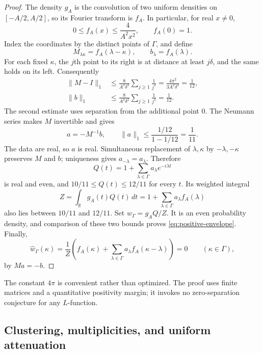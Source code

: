 \begin{proof}
The density $g_A$ is the convolution of two uniform densities on
$[-A/2,A/2]$, so its Fourier transform is $f_A$. In particular, for
real $x\ne0$,
\[
 0\le f_A(x)\le\frac4{A^2x^2},\qquad f_A(0)=1.
\]
Index the coordinates by the distinct points of $\Gamma$, and define
\[
 M_{\lambda\kappa}=f_A(\lambda-\kappa),
 \qquad b_\lambda=f_A(\lambda).
\]
For each fixed $\kappa$, the $j$th point to its right is at distance
at least $j\delta$, and the same holds on its left. Consequently
\begin{align}
 \|M-I\|_1
 &\le \frac8{A^2\delta^2}\sum_{j\ge1}\frac1{j^2}
 =\frac{4\pi^2}{3A^2\delta^2}=\frac1{12},\label{eq:matrix-bound}\\
 \|b\|_1
 &\le \frac8{A^2\delta^2}\sum_{j\ge1}\frac1{j^2}
 =\frac1{12}.\label{eq:rhs-bound}
\end{align}
The second estimate uses separation from the additional point $0$.
The Neumann series makes $M$ invertible and gives
\[
 a=-M^{-1}b,\qquad
 \|a\|_1\le\frac{1/12}{1-1/12}=\frac1{11}.
\]
The data are real, so $a$ is real. Simultaneous replacement of
$\lambda,\kappa$ by $-\lambda,-\kappa$ preserves $M$ and $b$;
uniqueness gives $a_{-\lambda}=a_\lambda$. Therefore
\[
 Q(t)=1+\sum_{\lambda\in\Gamma}a_\lambda e^{-i\lambda t}
\]
is real and even, and $10/11\le Q(t)\le12/11$ for every $t$.
Its weighted integral
\[
 Z=\int_{\mathbb R}g_A(t)Q(t)\,dt
   =1+\sum_{\lambda\in\Gamma}a_\lambda f_A(\lambda)
\]
also lies between $10/11$ and $12/11$. Set
$w_\Gamma=g_AQ/Z$. It is an even probability density, and comparison
of these two bounds proves \eqref{eq:positive-envelope}. Finally,
\[
 \widehat w_\Gamma(\kappa)
 =\frac1Z\left(f_A(\kappa)+
       \sum_{\lambda\in\Gamma}a_\lambda
                      f_A(\kappa-\lambda)\right)=0
 \qquad(\kappa\in\Gamma),
\]
by $Ma=-b$.
\end{proof}

The constant $4\pi$ is convenient rather than optimized. The proof
uses finite matrices and a quantitative positivity margin; it invokes
no zero-separation conjecture for any $L$-function.

\subsection{Clustering, multiplicities, and uniform attenuation}

